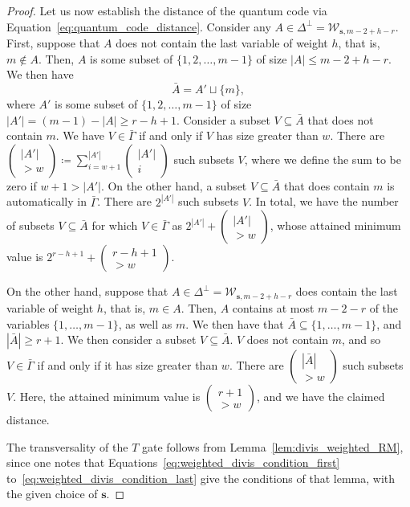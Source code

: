\documentclass{article}
\begin{document}
\begin{proof}
    Let us now establish the distance of the quantum code via Equation~\eqref{eq:quantum_code_distance}. Consider any $A \in \Delta^\perp = \mathcal{W}_{\boldsymbol{s},m-2+h-r}$. First, suppose that $A$ does not contain the last variable of weight $h$, that is, $m \notin A$. Then, $A$ is some subset of $\{1, 2, \ldots, m-1\}$ of size $|A|\leq m-2+h-r$. We then have
    \begin{equation}
        \bar{A} = A' \sqcup \{m\},
    \end{equation}
    where $A'$ is some subset of $\{1, 2, \ldots, m-1\}$ of size $|A'| = (m-1)-|A| \geq r-h+1$. Consider a subset $V\subseteq \bar{A}$ that does not contain $m$. We have $V \in \bar{\Gamma}$ if and only if $V$ has size greater than $w$. There are $\left(\begin{smallmatrix}|A'|\\>w\end{smallmatrix}\right) \coloneq \sum_{i= w +1}^{|A'|}\left(\begin{smallmatrix}|A'|\\i\end{smallmatrix}\right)$ such subsets $V$, where we define the sum to be zero if $w + 1 > |A'|$. On the other hand, a subset $V \subseteq \bar{A}$ that does contain $m$ is automatically in $\bar{\Gamma}$. There are $2^{|A'|}$ such subsets $V$. In total, we have the number of subsets $V \subseteq \bar{A}$ for which $V \in \bar{\Gamma}$ as $2^{|A'|} + \left(\begin{smallmatrix}|A'|\\>w\end{smallmatrix}\right)$, whose attained minimum value is $2^{r-h+1} + \left(\begin{smallmatrix}r-h+1\\>w\end{smallmatrix}\right)$.

    On the other hand, suppose that $A \in \Delta^\perp = \mathcal{W}_{\boldsymbol{s}, m-2+h-r}$ does contain the last variable of weight $h$, that is, $m \in A$. Then, $A$ contains at most $m-2-r$ of the variables $\{1, \ldots, m-1\}$, as well as $m$. We then have that $\bar{A} \subseteq \{1, \ldots, m-1\}$, and $|\bar{A}| \geq r+1$. We then consider a subset $V \subseteq \bar{A}$. $V$ does not contain $m$, and so $V \in \bar{\Gamma}$ if and only if it has size greater than $w$. There are $\left(\begin{smallmatrix}|\bar{A}|\\>w\end{smallmatrix}\right)$ such subsets $V$. Here, the attained minimum value is $\left(\begin{smallmatrix}r+1\\>w\end{smallmatrix}\right)$, and we have the claimed distance.

    The transversality of the $T$ gate follows from Lemma~\ref{lem:divis_weighted_RM}, since one notes that Equations~\eqref{eq:weighted_divis_condition_first} to~\eqref{eq:weighted_divis_condition_last} give the conditions of that lemma, with the given choice of $\boldsymbol{s}$.
\end{proof}
\end{document}
